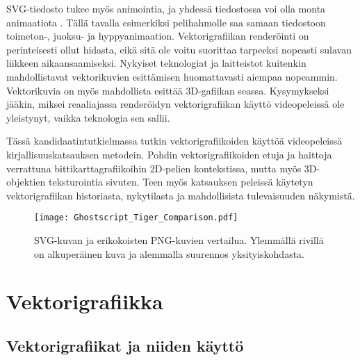 \documentclass[utf8,bachelor]{gradu3}
\begin{document}
SVG-tiedosto tukee myös animointia, ja yhdessä tiedostossa voi olla monta animaatiota \parencite{RefWorks:doc:5bd74719e4b0e42e08f6333b}. Tällä tavalla esimerkiksi pelihahmolle saa samaan tiedostoon toimeton-, juoksu- ja hyppyanimaation. Vektorigrafiikan renderöinti on perinteisesti ollut hidasta, eikä sitä ole voitu suorittaa tarpeeksi nopeasti sulavan liikkeen aikaansaamiseksi. Nykyiset teknologiat ja laitteistot kuitenkin mahdollistavat vektorikuvien esittämisen huomattavasti aiempaa nopeammin. Vektorikuvia on myös mahdollista esittää 3D-gafiikan seassa. \parencite{RefWorks:doc:5bc4a5cce4b080e02f7eff1b} Kysymykseksi jääkin, miksei reaaliajassa renderöidyn vektorigrafiikan käyttö videopeleissä ole yleistynyt, vaikka teknologia sen sallii. %

Tässä kandidaatintutkielmassa tutkin vektorigrafiikoiden käyttöä videopeleissä kirjallisuuskatsauksen metodein. Pohdin vektorigrafiikoiden etuja ja haittoja verrattuna bittikarttagrafiikoihin 2D-pelien kontekstissa, mutta myös 3D-objektien teksturointia sivuten. Teen myös katsauksen peleissä käytetyn vektorigrafiikan historiasta, nykytilasta ja mahdollisista tulevaisuuden näkymistä.


\begin{figure}[!b]
	\centering
	\texttt{[image: Ghostscript\_Tiger\_Comparison.pdf]}
    \caption{SVG-kuvan ja erikokoisten PNG-kuvien vertailua. Ylemmällä rivillä on alkuperäinen kuva ja alemmalla suurennos yksityiskohdasta.}\label{vertailu}
\end{figure}

\chapter{Vektorigrafiikka}

\section{Vektorigrafiikat ja niiden käyttö}\label{määrittely}

\end{document}
